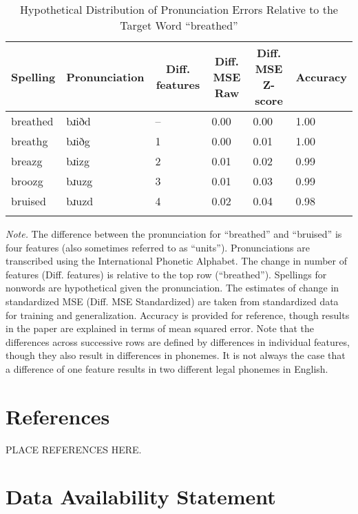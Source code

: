 \documentclass[
  ,man,floatsintext]{apa6}
\begin{document}
\begin{table}[tbp]

\begin{center}
\begin{threeparttable}

\caption{\label{tab:table2}Hypothetical Distribution of Pronunciation Errors Relative to the Target Word “breathed”}

\begin{tabular}{llllll}
\toprule
Spelling & \multicolumn{1}{c}{Pronunciation} & \multicolumn{1}{c}{Diff. features} & \multicolumn{1}{c}{Diff. MSE Raw} & \multicolumn{1}{c}{Diff. MSE Z-score} & \multicolumn{1}{c}{Accuracy}\\
\midrule
breathed & bɹiðd & – & 0.00 & 0.00 & 1.00\\
breathg & bɹiðg & 1 & 0.00 & 0.01 & 1.00\\
breazg & bɹizg & 2 & 0.01 & 0.02 & 0.99\\
broozg & bɹuzg & 3 & 0.01 & 0.03 & 0.99\\
bruised & bɹuzd & 4 & 0.02 & 0.04 & 0.98\\
\bottomrule
\addlinespace
\end{tabular}

\begin{tablenotes}[para]
\normalsize{\textit{Note.} The difference between the pronunciation for “breathed” and “bruised” is four features (also sometimes referred to as “units”). Pronunciations are transcribed using the International Phonetic Alphabet. The change in number of features (Diff. features) is relative to the top row (“breathed”). Spellings for nonwords are hypothetical given the pronunciation. The estimates of change in standardized MSE (Diff. MSE Standardized) are taken from standardized data for training and generalization. Accuracy is provided for reference, though results in the paper are explained in terms of mean squared error. Note that the differences across successive rows are defined by differences in individual features, though they also result in differences in phonemes. It is not always the case that a difference of one feature results in two different legal phonemes in English.}
\end{tablenotes}

\end{threeparttable}
\end{center}

\end{table}

\section{References}\label{references}

\begin{hangparas}{1.5em}{1}
PLACE REFERENCES HERE.

\end{hangparas}

\section{Data Availability Statement}\label{data-availability-statement}


\clearpage
\renewcommand{\listtablename}{Table captions}
\end{document}
